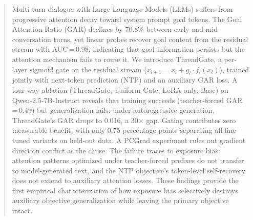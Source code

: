 \begin{abstract}
Multi-turn dialogue with Large Language Models (LLMs) suffers from progressive attention decay toward system prompt goal tokens. The Goal Attention Ratio (GAR) declines by 70.8\% between early and mid-conversation turns, yet linear probes recover goal content from the residual stream with AUC\,=\,0.98, indicating that goal information persists but the attention mechanism fails to route it. We introduce ThreadGate, a per-layer sigmoid gate on the residual stream ($x_{l+1} = x_l + g_l \cdot f_l(x_l)$), trained jointly with next-token prediction (NTP) and an auxiliary GAR loss. A four-way ablation (ThreadGate, Uniform Gate, LoRA-only, Base) on Qwen-2.5-7B-Instruct reveals that training succeeds (teacher-forced GAR\,=\,0.49) but generalization fails: under autoregressive generation, ThreadGate's GAR drops to 0.016, a 30$\times$ gap. Gating contributes zero measurable benefit, with only 0.75 percentage points separating all fine-tuned variants on held-out data. A PCGrad experiment rules out gradient direction conflict as the cause. The failure traces to exposure bias: attention patterns optimized under teacher-forced prefixes do not transfer to model-generated text, and the NTP objective's token-level self-recovery does not extend to auxiliary attention losses. These findings provide the first empirical characterization of how exposure bias selectively destroys auxiliary objective generalization while leaving the primary objective intact.
\end{abstract}
